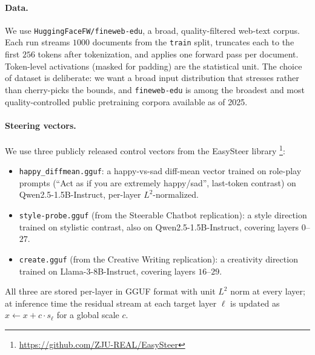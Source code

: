 \paragraph{Data.} We use \texttt{HuggingFaceFW/fineweb-edu}, a broad, quality-filtered web-text corpus. Each run streams $1000$ documents from the \texttt{train} split, truncates each to the first $256$ tokens after tokenization, and applies one forward pass per document. Token-level activations (masked for padding) are the statistical unit. The choice of dataset is deliberate: we want a broad input distribution that stresses rather than cherry-picks the bounds, and \texttt{fineweb-edu} is among the broadest and most quality-controlled public pretraining corpora available as of 2025.

\paragraph{Steering vectors.} We use three publicly released control vectors from the EasySteer library
\footnote{\url{https://github.com/ZJU-REAL/EasySteer}}:
\begin{itemize}
  \item \texttt{happy\_diffmean.gguf}: a happy-vs-sad diff-mean vector trained on role-play prompts (``Act as if you are extremely happy/sad'', last-token contrast) on Qwen2.5-1.5B-Instruct, per-layer $L^2$-normalized.
  \item \texttt{style-probe.gguf} (from the Steerable Chatbot replication): a style direction trained on stylistic contrast, also on Qwen2.5-1.5B-Instruct, covering layers $0$--$27$.
  \item \texttt{create.gguf} (from the Creative Writing replication): a creativity direction trained on Llama-3-8B-Instruct, covering layers $16$--$29$.
\end{itemize}
All three are stored per-layer in GGUF format with unit $L^2$ norm at every layer; at inference time the residual stream at each target layer $\ell$ is updated as $x \leftarrow x + c \cdot s_\ell$ for a global scale $c$.

